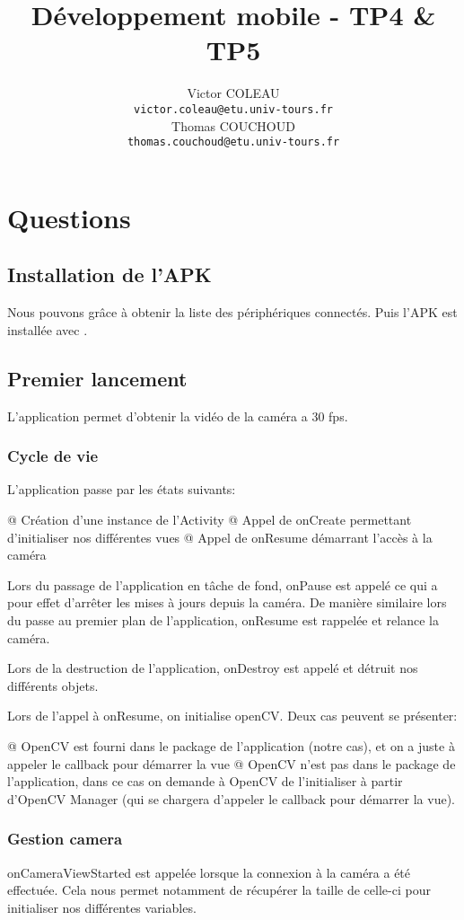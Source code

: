 \documentclass{report}
\title{Développement mobile - TP4 \& TP5}
\author{Victor COLEAU\\\texttt{victor.coleau@etu.univ-tours.fr}\\Thomas COUCHOUD\\\texttt{thomas.couchoud@etu.univ-tours.fr}}
\begin{document}
	\mccTitle
	\tableofcontents
	\chapter{Questions}
		\section{Installation de l'APK}
			Nous pouvons grâce à  obtenir la liste des périphériques connectés.
			Puis l'APK est installée avec .
			
		\section{Premier lancement}
			L'application permet d'obtenir la vidéo de la caméra a 30 fps.
			
			\subsection{Cycle de vie}
				L'application passe par les états suivants:
				\begin{easylist}
					@ Création d'une instance de l'Activity
					@ Appel de onCreate permettant d'initialiser nos différentes vues
					@ Appel de onResume démarrant l'accès à la caméra
				\end{easylist}
				
				Lors du passage de l'application en tâche de fond, onPause est appelé ce qui a pour effet d'arrêter les mises à jours depuis la caméra.
				De manière similaire lors du passe au premier plan de l'application, onResume est rappelée et relance la caméra.
				
				Lors de la destruction de l'application, onDestroy est appelé et détruit nos différents objets.
				
				Lors de l'appel à onResume, on initialise openCV. Deux cas peuvent se présenter:
				\begin{easylist}[itemize]
					@ OpenCV est fourni dans le package de l'application (notre cas), et on a juste à appeler le callback pour démarrer la vue
					@ OpenCV n'est pas dans le package de l'application, dans ce cas on demande à OpenCV de l'initialiser à partir d'OpenCV Manager (qui se chargera d'appeler le callback pour démarrer la vue).
				\end{easylist}
			
			\subsection{Gestion camera}
				onCameraViewStarted est appelée lorsque la connexion à la caméra a été effectuée.
				Cela nous permet notamment de récupérer la taille de celle-ci pour initialiser nos différentes variables.
				
\end{document}
